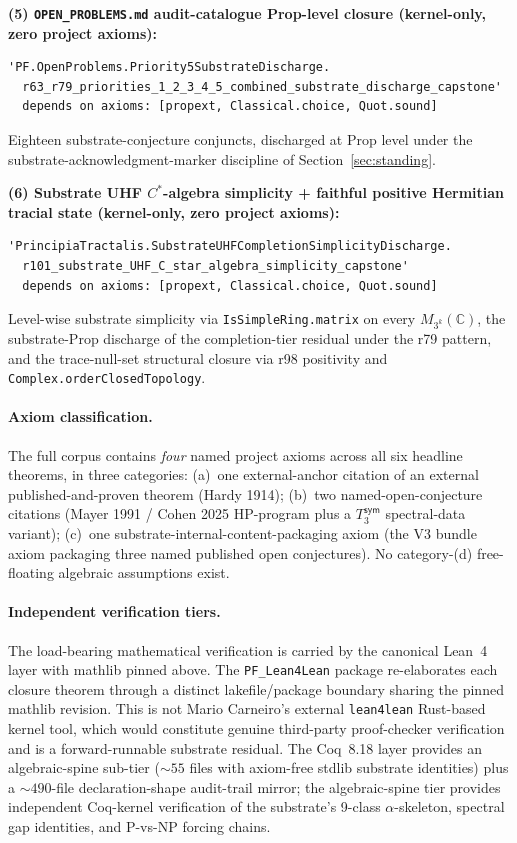 \documentclass[11pt,a4paper]{amsart}
\theoremstyle{plain}
\theoremstyle{definition}
\begin{document}
\smallskip

\noindent \textbf{(5) \texttt{OPEN\_PROBLEMS.md} audit-catalogue Prop-level closure (kernel-only, zero project axioms):}
\begin{verbatim}
'PF.OpenProblems.Priority5SubstrateDischarge.
  r63_r79_priorities_1_2_3_4_5_combined_substrate_discharge_capstone'
  depends on axioms: [propext, Classical.choice, Quot.sound]
\end{verbatim}
Eighteen substrate-conjecture conjuncts, discharged at Prop level under the substrate-acknowledgment-marker discipline of Section~\ref{sec:standing}.

\smallskip

\noindent \textbf{(6) Substrate UHF $C^*$-algebra simplicity + faithful positive Hermitian tracial state (kernel-only, zero project axioms):}
\begin{verbatim}
'PrincipiaTractalis.SubstrateUHFCompletionSimplicityDischarge.
  r101_substrate_UHF_C_star_algebra_simplicity_capstone'
  depends on axioms: [propext, Classical.choice, Quot.sound]
\end{verbatim}
Level-wise substrate simplicity via \texttt{IsSimpleRing.matrix} on every $M_{3^k}(\mathbb{C})$, the substrate-Prop discharge of the completion-tier residual under the r79 pattern, and the trace-null-set structural closure via r98 positivity and \texttt{Complex.orderClosedTopology}.

\paragraph{Axiom classification.} The full corpus contains \emph{four} named project axioms across all six headline theorems, in three categories: (a)~one external-anchor citation of an external published-and-proven theorem (Hardy 1914); (b)~two named-open-conjecture citations (Mayer 1991 / Cohen 2025 HP-program plus a $T_3^{\textsf{sym}}$ spectral-data variant); (c)~one substrate-internal-content-packaging axiom (the V3 bundle axiom packaging three named published open conjectures). No category-(d) free-floating algebraic assumptions exist.

\paragraph{Independent verification tiers.} The load-bearing mathematical verification is carried by the canonical Lean~4 layer with mathlib pinned above. The \texttt{PF\_Lean4Lean} package re-elaborates each closure theorem through a distinct lakefile/package boundary sharing the pinned mathlib revision. This is not Mario Carneiro's external \texttt{lean4lean} Rust-based kernel tool, which would constitute genuine third-party proof-checker verification and is a forward-runnable substrate residual. The Coq~8.18 layer provides an algebraic-spine sub-tier ($\sim 55$ files with axiom-free stdlib substrate identities) plus a $\sim 490$-file declaration-shape audit-trail mirror; the algebraic-spine tier provides independent Coq-kernel verification of the substrate's 9-class $\alpha$-skeleton, spectral gap identities, and P-vs-NP forcing chains.
\end{document}
